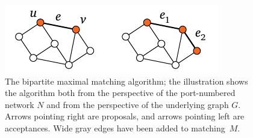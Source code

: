 \begin{figure}
    \centering
    \includegraphics[page=\PMaximalMatching]{figs.pdf}
    \caption{The bipartite maximal matching algorithm; the illustration shows the algorithm both from the perspective of the port-numbered network $N$ and from the perspective of the underlying graph $G$. Arrows pointing right are proposals, and arrows pointing left are acceptances. Wide gray edges have been added to matching~$M$.}\label{fig:bmm}
\end{figure}

